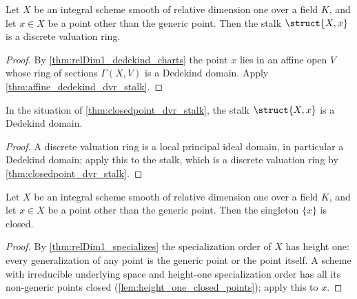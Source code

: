 \begin{theorem}
  \label{thm:closedpoint_dvr_stalk}
  \leanok
  Let \(X\) be an integral scheme smooth of relative dimension one over a field \(K\), and let
  \(x \in X\) be a point other than the generic point. Then the stalk \(\struct{X,x}\) is a
  discrete valuation ring.
\end{theorem}
\begin{proof}
  \leanok
  By \ref{thm:relDim1_dedekind_charts} the point \(x\) lies in an affine open \(V\) whose ring
  of sections \(\Gamma(X, V)\) is a Dedekind domain. Apply \ref{thm:affine_dedekind_dvr_stalk}.
\end{proof}

\begin{theorem}
  \label{thm:closedpoint_dedekind_stalk}
  \leanok
  In the situation of \ref{thm:closedpoint_dvr_stalk}, the stalk \(\struct{X,x}\) is a Dedekind
  domain.
\end{theorem}
\begin{proof}
  \leanok
  A discrete valuation ring is a local principal ideal domain, in particular a Dedekind domain;
  apply this to the stalk, which is a discrete valuation ring by \ref{thm:closedpoint_dvr_stalk}.
\end{proof}

\begin{theorem}
  \label{thm:closedpoint_isClosed}
  \leanok
  Let \(X\) be an integral scheme smooth of relative dimension one over a field \(K\), and let
  \(x \in X\) be a point other than the generic point. Then the singleton \(\{x\}\) is closed.
\end{theorem}
\begin{proof}
  \leanok
  By \ref{thm:relDim1_specializes} the specialization order of \(X\) has height one: every
  generalization of any point is the generic point or the point itself. A scheme with
  irreducible underlying space and height-one specialization order has all its non-generic
  points closed (\ref{lem:height_one_closed_points}); apply this to \(x\).
\end{proof}

